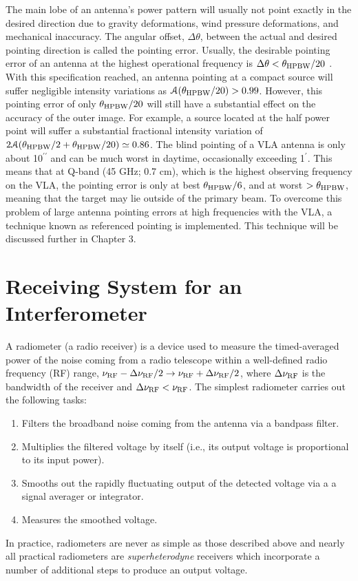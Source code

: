 The main lobe of an antenna's power pattern will usually not point exactly in the desired direction due to gravity deformations, wind pressure deformations, and mechanical inaccuracy. The angular offset, $\Delta \theta$, between the actual and desired pointing direction is called the pointing error. Usually, the desirable pointing error of  an antenna at the highest operational frequency is $\Delta \theta < \theta _{\rm{HPBW}}/20$ \citep{taylor_1999}. With this specification reached, an antenna pointing at a compact source will suffer negligible intensity variations as $\mathcal{A}(\theta _{\rm{HPBW}}/20) > 0.99$. However, this pointing error of only $\theta _{\rm{HPBW}}/20$ will still have a substantial effect on the accuracy of the outer image. For example, a source located at the half power point will suffer a substantial fractional intensity variation of $2\mathcal{A}(\theta _{\rm{HPBW}}/2+\theta _{\rm{HPBW}}/20) \simeq 0.86$. The blind pointing of a VLA antenna is only about 10$^{\prime\prime}$ and can be much worst in daytime, occasionally exceeding 1$^{\prime}$. This means that at Q-band (45 GHz; 0.7 cm), which is the highest observing frequency on the VLA, the pointing error is only at best $\theta _{\rm{HPBW}}/6$, and at worst $>\theta _{\rm{HPBW}}$, meaning that the target may lie outside of the primary beam. To overcome this problem of large antenna pointing errors at high frequencies with the VLA, a technique known as referenced pointing is implemented. This technique will be discussed further in Chapter 3. 

\section{Receiving System for an Interferometer}\label{sec:2.2}

A radiometer (a radio receiver) is a device  used to measure the  timed-averaged power of the noise coming from a radio telescope within a  well-defined radio frequency (RF) range, $\nu _{\rm{RF}}-\Delta \nu _{\rm{RF}}/2 \rightarrow \nu _{\rm{RF}}+\Delta \nu _{\rm{RF}}/2$, where $\Delta \nu _{\rm{RF}}$ is the bandwidth of the receiver and $\Delta \nu _{\rm{RF}}< \nu _{\rm{RF}}$. 
The simplest radiometer carries out the following tasks:
\begin{enumerate}
\item Filters the broadband noise coming from the antenna via a bandpass filter.
\item Multiplies the filtered voltage by itself (i.e., its output voltage is proportional to its input power).
\item Smooths out the rapidly fluctuating output of the detected voltage via a a signal averager or integrator.
\item Measures the smoothed voltage.
\end{enumerate}
In practice, radiometers are never as simple as those described above and nearly all practical radiometers are \textit{superheterodyne} receivers which incorporate a number of additional steps to produce an output voltage.

